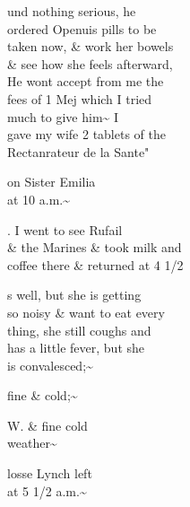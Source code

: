 \documentclass{report}
\begin{document}





	\par{
 	und nothing serious, he\ \\ordered Openuis pills to be\ \\taken now, \& work her bowels\ \\\& see how she feels afterward,\ \\He wont accept from me the\ \\fees of 1 Mej which I tried\ \\much to give him\~{} I\ \\gave my wife 2 tablets of the\ \\Rectanrateur de la Sante"\ \\
	}

	\par{
 	on Sister Emilia\ \\at 10 a.m.\~{}\ \\
	}

	\par{
 	. I went to see Rufail\ \\\& the Marines \& took milk and\ \\coffee there \& returned at 4 1/2\ \\
	}

	\par{
 	s well, but she is getting\ \\so noisy \& want to eat every\ \\thing, she still coughs and\ \\has a little fever, but she\ \\is convalesced;\~{}\ \\
	}

	\par{
 	fine \& cold;\~{}\ \\
	}


	\par{
 	W. \& fine cold\ \\weather\~{}\ \\
	}

	\par{
 	losse Lynch left\ \\at 5 1/2 a.m.\~{}\ \\
	}
\end{document}
